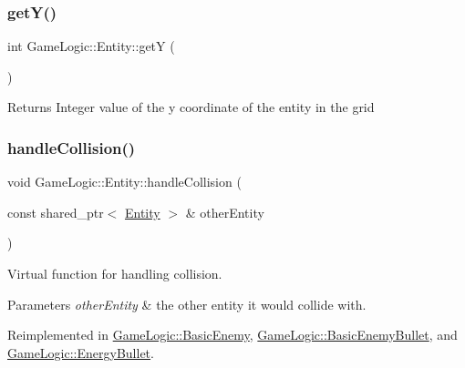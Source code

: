 \subsubsection{\texorpdfstring{get\+Y()}{getY()}}
{\footnotesize\ttfamily int Game\+Logic\+::\+Entity\+::getY (\begin{DoxyParamCaption}{ }\end{DoxyParamCaption})}

\begin{DoxyReturn}{Returns}
Integer value of the y coordinate of the entity in the grid 
\end{DoxyReturn}
\mbox{\label{classGameLogic_1_1Entity_af3461a4c6321b1af250821d7a1329ba7}} 
\subsubsection{\texorpdfstring{handle\+Collision()}{handleCollision()}}
{\footnotesize\ttfamily void Game\+Logic\+::\+Entity\+::handle\+Collision (\begin{DoxyParamCaption}\item[{const shared\+\_\+ptr$<$ \hyperlink{classGameLogic_1_1Entity}{Entity} $>$ \&}]{other\+Entity }\end{DoxyParamCaption})\hspace{0.3cm}{\ttfamily [virtual]}}

Virtual function for handling collision. 
\begin{DoxyParams}{Parameters}
{\em other\+Entity} & the other entity it would collide with. \\
\hline
\end{DoxyParams}


Reimplemented in \hyperlink{classGameLogic_1_1BasicEnemy_a3d01ac4181b0aaa6058d434195e68830}{Game\+Logic\+::\+Basic\+Enemy}, \hyperlink{classGameLogic_1_1BasicEnemyBullet_a220f79a5cb5bfb33e63ad232457bad54}{Game\+Logic\+::\+Basic\+Enemy\+Bullet}, and \hyperlink{classGameLogic_1_1EnergyBullet_a5eafebaf5fccf0a3bf3375def4ff32d2}{Game\+Logic\+::\+Energy\+Bullet}.

\mbox{\label{classGameLogic_1_1Entity_a5bfae36adfedd3652d8dd8a807184c5f}} 
